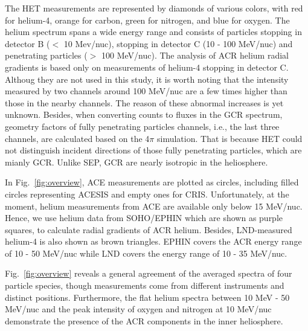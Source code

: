 The \ac{HET} measurements are represented by diamonds of various colors, with red for helium-4, orange for carbon, green for nitrogen, and blue for oxygen.
The helium spectrum spans a wide energy range and consists of particles stopping in detector B ($<$ 10 Mev/nuc), stopping in detector C (10 - 100 MeV/nuc) and penetrating particles ($>$ 100 MeV/nuc). 
The analysis of \ac{ACR} helium radial gradients is based only on measurements of helium-4 stopping in detector C.
Althoug they are not used in this study, it is worth noting that the intensity measured by two channels around 100 MeV/nuc are a few times higher than those in the nearby channels. The reason of these abnormal increases is yet unknown.
Besides, when converting counts to fluxes in the \ac{GCR} spectrum, geometry factors of fully penetrating particles channels, i.e., the last three channels, are calculated based on the 4$\pi$ simulation. That is because \ac{HET} could not distinguish incident directions of those fully penetrating particles, which are mianly \acs{GCR}. Unlike \acs{SEP}, \acs{GCR} are nearly isotropic in the heliosphere. 

In Fig.~\ref{fig:overview}, \ac{ACE} measurements are plotted as circles, including filled circles representing \ac{ACESIS} and empty ones for \ac{CRIS}. Unfortunately, at the moment, helium measurements from \ac{ACE} are available only below 15 MeV/nuc. Hence, we use helium data from \ac{SOHO}/\ac{EPHIN} which are shown as purple squares, to calculate radial gradients of \ac{ACR} helium. Besides, \ac{LND}-measured helium-4 is also shown as brown triangles. \ac{EPHIN} covers the \ac{ACR} energy range of 10 - 50 MeV/nuc while \ac{LND} covers the energy range of 10 - 35 MeV/nuc.

Fig.~\ref{fig:overview} reveals a general agreement of the averaged spectra of four particle species, though measurements come from different instruments and distinct positions. Furthermore, the flat helium spectra between 10 MeV - 50 MeV/nuc and the peak intensity of oxygen and nitrogen at 10 MeV/nuc demonstrate the presence of the \ac{ACR} components in the inner heliosphere. 

